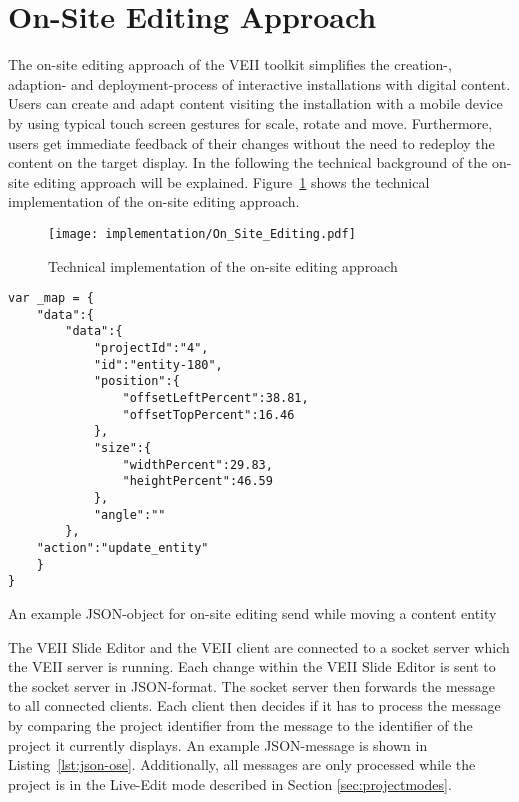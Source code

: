 \section{On-Site Editing Approach}
\label{sec:onsiteeditingapproach}
The on-site editing approach of the VEII toolkit simplifies the creation-, adaption- and deployment-process of interactive installations with digital content. Users can create and adapt content visiting the installation with a mobile device by using typical touch screen gestures for scale, rotate and move. Furthermore, users get immediate feedback of their changes without the need to redeploy the content on the target display. In the following the technical background of the on-site editing approach will be explained.
Figure~\ref{fig:onsiteediting} shows the technical implementation of the on-site editing approach.
\begin{figure}
  \begin{center}
    \texttt{[image: implementation/On\_Site\_Editing.pdf]}
    \caption{Technical implementation of the on-site editing approach}
    \label{fig:onsiteediting}
  \end{center}
\end{figure}

\begin{Listing}
\begin{lstlisting}
var _map = {
	"data":{
		"data":{
			"projectId":"4",
			"id":"entity-180",
			"position":{
				"offsetLeftPercent":38.81,
				"offsetTopPercent":16.46
			},
			"size":{
				"widthPercent":29.83,
				"heightPercent":46.59
			},
			"angle":""
		},
	"action":"update_entity"
	}
}
\end{lstlisting}
\caption{An example JSON-object for on-site editing send while moving a content entity}
\label{lst:json-ose}
\end{Listing}

The VEII Slide Editor and the VEII client are connected to a socket server which the VEII server is running. Each change within the VEII Slide Editor is sent to the socket server in JSON-format. The socket server then forwards the message to all connected clients. Each client then decides if it has to process the message by comparing the project identifier from the message to the identifier of the project it currently displays. 
An example JSON-message is shown in Listing~\ref{lst:json-ose}. Additionally, all messages are only processed while the project is in the Live-Edit mode described in Section \ref{sec:projectmodes}.

